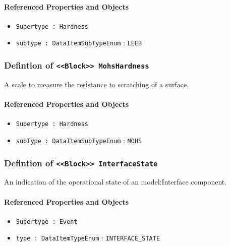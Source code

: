\FloatBarrier
\paragraph{Referenced Properties and Objects}

\begin{itemize}
\item \texttt{Supertype : Hardness}

\item \texttt{subType : DataItemSubTypeEnum} : \texttt{LEEB}

\end{itemize}
\FloatBarrier
\subsubsection{Defintion of \texttt{<<Block>> MohsHardness}}
  \label{type:MohsHardness}

\FloatBarrier

A scale to measure the resistance to scratching of a surface.

\FloatBarrier
\paragraph{Referenced Properties and Objects}

\begin{itemize}
\item \texttt{Supertype : Hardness}

\item \texttt{subType : DataItemSubTypeEnum} : \texttt{MOHS}

\end{itemize}
\FloatBarrier
\subsubsection{Defintion of \texttt{<<Block>> InterfaceState}}
  \label{type:InterfaceState}

\FloatBarrier

An indication of the operational state of an {model:Interface} component.

\FloatBarrier
\paragraph{Referenced Properties and Objects}

\begin{itemize}
\item \texttt{Supertype : Event}

\item \texttt{type : DataItemTypeEnum} : \texttt{INTERFACE_STATE}

\end{itemize}
\FloatBarrier
